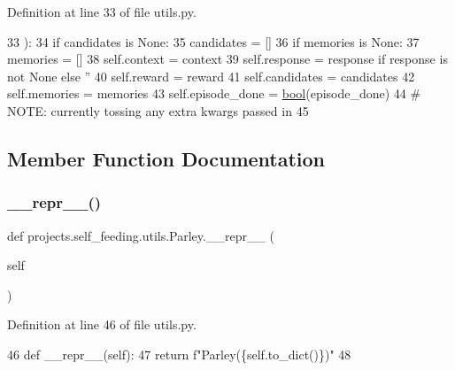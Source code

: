 Definition at line 33 of file utils.\+py.


\begin{DoxyCode}
33     ):
34         \textcolor{keywordflow}{if} candidates \textcolor{keywordflow}{is} \textcolor{keywordtype}{None}:
35             candidates = []
36         \textcolor{keywordflow}{if} memories \textcolor{keywordflow}{is} \textcolor{keywordtype}{None}:
37             memories = []
38         self.context = context
39         self.response = response \textcolor{keywordflow}{if} response \textcolor{keywordflow}{is} \textcolor{keywordflow}{not} \textcolor{keywordtype}{None} \textcolor{keywordflow}{else} \textcolor{stringliteral}{''}
40         self.reward = reward
41         self.candidates = candidates
42         self.memories = memories
43         self.episode\_done = \hyperlink{namespaceprojects_1_1mastering__the__dungeon_1_1mturk_1_1tasks_1_1MTD_1_1run_a6fc0c9b519a36f82b65bcd398f1fbb9d}{bool}(episode\_done)
44         \textcolor{comment}{# NOTE: currently tossing any extra kwargs passed in}
45 
\end{DoxyCode}


\subsection{Member Function Documentation}
\mbox{\label{classprojects_1_1self__feeding_1_1utils_1_1Parley_a292050db5a9830826c1d7c8dbd8293e2}} 
\subsubsection{\texorpdfstring{\+\_\+\+\_\+repr\+\_\+\+\_\+()}{\_\_repr\_\_()}}
{\footnotesize\ttfamily def projects.\+self\+\_\+feeding.\+utils.\+Parley.\+\_\+\+\_\+repr\+\_\+\+\_\+ (\begin{DoxyParamCaption}\item[{}]{self }\end{DoxyParamCaption})}



Definition at line 46 of file utils.\+py.


\begin{DoxyCode}
46     \textcolor{keyword}{def }\_\_repr\_\_(self):
47         \textcolor{keywordflow}{return} f\textcolor{stringliteral}{"Parley(\{self.to\_dict()\})"}
48 
\end{DoxyCode}
\mbox{\label{classprojects_1_1self__feeding_1_1utils_1_1Parley_a8d2421540ef61a300e999b96c66ffc96}} 
